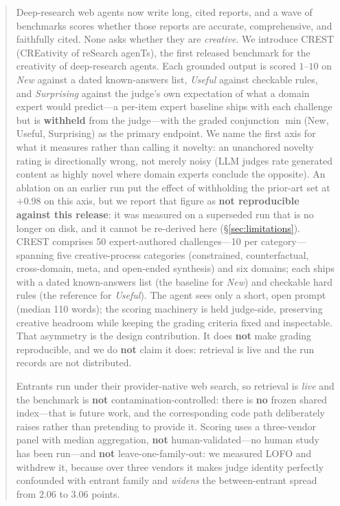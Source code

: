 \begin{abstract}
Deep-research web agents now write long, cited reports, and a wave of benchmarks scores whether those reports are accurate, comprehensive, and faithfully cited. None asks whether they are \emph{creative}. We introduce \textsc{CREST} (CREativity of reSearch agenTs), the first released benchmark for the creativity of deep-research agents. Each grounded output is scored $1$--$10$ on \emph{New} against a dated known-answers list, \emph{Useful} against checkable rules, and \emph{Surprising} against the judge's own expectation of what a domain expert would predict---a per-item expert baseline ships with each challenge but is \textbf{withheld} from the judge---with the graded conjunction $\min$(New, Useful, Surprising) as the primary endpoint. We name the first axis for what it measures rather than calling it novelty: an unanchored novelty rating is directionally wrong, not merely noisy (LLM judges rate generated content as highly novel where domain experts conclude the opposite). An ablation on an earlier run put the effect of withholding the prior-art set at $+0.98$ on this axis, but we report that figure as \textbf{not reproducible against this release}: it was measured on a superseded run that is no longer on disk, and it cannot be re-derived here (\S\ref{sec:limitations}). CREST comprises 50 expert-authored challenges---10 per category---spanning five creative-process categories (constrained, counterfactual, cross-domain, meta, and open-ended synthesis) and six domains; each ships with a dated known-answers list (the baseline for \emph{New}) and checkable hard rules (the reference for \emph{Useful}). The agent sees only a short, open prompt (median 110 words); the scoring machinery is held judge-side, preserving creative headroom while keeping the grading criteria fixed and inspectable. That asymmetry is the design contribution. It does \textbf{not} make grading reproducible, and we do \textbf{not} claim it does: retrieval is live and the run records are not distributed.

Entrants run under their provider-native web search, so retrieval is \emph{live} and the benchmark is \textbf{not} contamination-controlled: there is \textbf{no} frozen shared index---that is future work, and the corresponding code path deliberately raises rather than pretending to provide it. Scoring uses a three-vendor panel with median aggregation, \textbf{not} human-validated---no human study has been run---and \textbf{not} leave-one-family-out: we measured LOFO and withdrew it, because over three vendors it makes judge identity perfectly confounded with entrant family and \emph{widens} the between-entrant spread from $2.06$ to $3.06$ points.


\end{abstract}
